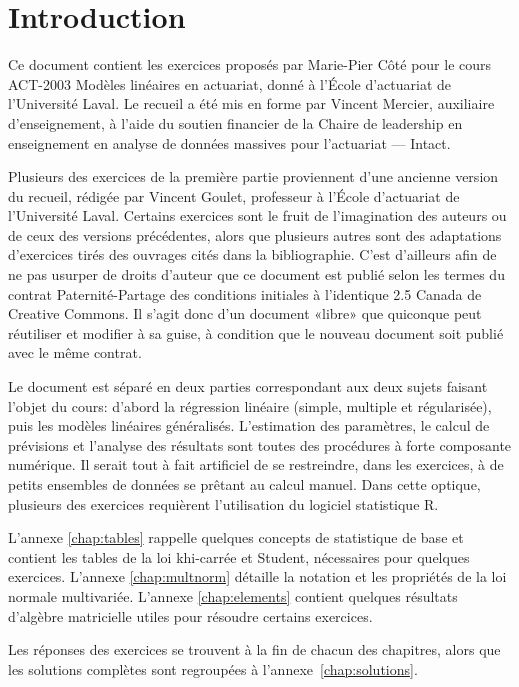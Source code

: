 \chapter*{Introduction}


Ce document contient les exercices proposés par Marie-Pier Côté pour le cours ACT-2003 Modèles linéaires en actuariat, donné à l'École d'actuariat de l'Université Laval. Le recueil a été mis en forme par Vincent Mercier, auxiliaire d'enseignement, à l'aide du soutien financier de la Chaire de leadership en enseignement en analyse de données massives pour l'actuariat --- Intact. 

Plusieurs des exercices de la première partie proviennent d'une ancienne version du recueil, rédigée par Vincent Goulet, professeur à l'École d'actuariat de l'Université Laval. Certains exercices sont le fruit de l'imagination des auteurs ou de ceux des versions précédentes, alors que plusieurs autres sont des adaptations d'exercices tirés des ouvrages cités dans la bibliographie. C'est d'ailleurs afin de ne pas usurper de droits d'auteur que ce document est publié selon les termes du contrat Paternité-Partage des conditions initiales à l’identique 2.5 Canada de Creative Commons. Il s'agit donc d'un document «libre» que quiconque peut réutiliser et modifier à sa guise, à condition que le nouveau document soit publié avec le même contrat.

Le document est séparé en deux parties correspondant aux deux sujets faisant l'objet du cours: d'abord la régression linéaire (simple, multiple et régularisée), puis les modèles linéaires généralisés. L'estimation des paramètres, le calcul de prévisions et l'analyse des résultats sont toutes des procédures à forte composante numérique. Il serait tout à fait artificiel de se restreindre, dans les exercices, à de petits ensembles de données se prêtant au calcul manuel. Dans cette optique, plusieurs des exercices requièrent l'utilisation du logiciel statistique \textsf{R}.

L'annexe \ref{chap:tables} rappelle quelques concepts de statistique de base et contient les tables de la loi khi-carrée et Student, nécessaires pour quelques exercices. L'annexe \ref{chap:multnorm} détaille la notation et les propriétés de la loi normale multivariée. L'annexe \ref{chap:elements} contient quelques résultats d'algèbre matricielle utiles pour résoudre certains exercices.

Les réponses des exercices se trouvent à la fin de chacun des
chapitres, alors que les solutions complètes sont regroupées à
l'annexe~\ref{chap:solutions}.

